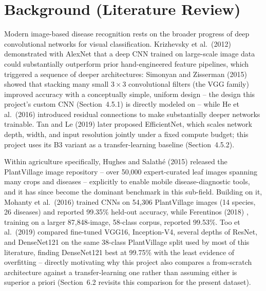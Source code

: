 \documentclass[12pt,a4paper]{article}
\begin{document}
\section{Background (Literature Review)}
Modern image-based disease recognition rests on the broader progress of deep
convolutional networks for visual classification. Krizhevsky et al.\ (2012)
\cite{krizhevsky2012} demonstrated with AlexNet that a deep CNN trained on
large-scale image data could substantially outperform prior hand-engineered
feature pipelines, which triggered a sequence of deeper architectures:
Simonyan and Zisserman (2015) \cite{simonyan2015} showed that stacking many
small $3\times3$ convolutional filters (the VGG family) improved accuracy
with a conceptually simple, uniform design -- the design this project's
custom CNN (Section~4.5.1) is directly modeled on -- while He et al.\ (2016)
\cite{he2016resnet} introduced residual connections to make substantially
deeper networks trainable. Tan and Le (2019) \cite{tan2019efficientnet}
later proposed EfficientNet, which scales network depth, width, and input
resolution jointly under a fixed compute budget; this project uses its B3
variant as a transfer-learning baseline (Section~4.5.2).

Within agriculture specifically, Hughes and Salathé (2015)
\cite{hughes2015} released the PlantVillage image repository -- over 50{,}000
expert-curated leaf images spanning many crops and diseases -- explicitly to
enable mobile disease-diagnostic tools, and it has since become the
dominant benchmark in this sub-field. Building on it, Mohanty et al.\ (2016)
\cite{mohanty2016} trained CNNs on 54{,}306 PlantVillage images (14 species,
26 diseases) and reported 99.35\% held-out accuracy, while Ferentinos (2018)
\cite{ferentinos2018}, training on a larger 87{,}848-image, 58-class corpus,
reported 99.53\%. Too et al.\ (2019) \cite{too2019} compared fine-tuned VGG16,
Inception-V4, several depths of ResNet, and DenseNet121 on the same 38-class
PlantVillage split used by most of this literature, finding DenseNet121 best
at 99.75\% with the least evidence of overfitting -- directly motivating why
this project also compares a from-scratch architecture against a
transfer-learning one rather than assuming either is superior a priori
(Section~6.2 revisits this comparison for the present dataset).
\end{document}
